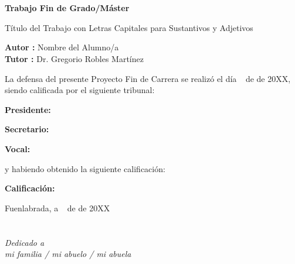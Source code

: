 \documentclass[a4paper, 12pt, english]{book}
\begin{document}
\newpage
\mbox{}
\thispagestyle{empty} %


\clearpage
{}
\chapter*{}

\vspace{-4cm}
\begin{center}
\LARGE
\textbf{Trabajo Fin de Grado/Máster}

\vspace{1cm}
\large
Título del Trabajo con Letras Capitales para Sustantivos y Adjetivos

\vspace{1cm}
\large
\textbf{Autor :} Nombre del Alumno/a \\
\textbf{Tutor :} Dr. Gregorio Robles Martínez

\end{center}

\vspace{1cm}
La defensa del presente Proyecto Fin de Carrera se realizó el día \qquad$\;\,$ de \qquad\qquad\qquad\qquad \newline de 20XX, siendo calificada por el siguiente tribunal:


\vspace{0.5cm}
\textbf{Presidente:}

\vspace{1.2cm}
\textbf{Secretario:}

\vspace{1.2cm}
\textbf{Vocal:}


\vspace{1.2cm}
y habiendo obtenido la siguiente calificación:

\vspace{1cm}
\textbf{Calificación:}


\vspace{1cm}
\begin{flushright}
Fuenlabrada, a \qquad$\;\,$ de \qquad\qquad\qquad\qquad de 20XX
\end{flushright}


\chapter*{}
\begin{flushright}
\textit{Dedicado a \\
mi familia / mi abuelo / mi abuela}
\end{flushright}
\end{document}
